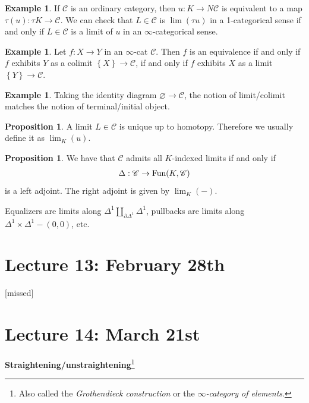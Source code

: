 \documentclass[12pt]{amsart}
\theoremstyle{definition}
\newtheorem{example}[theorem]{Example}
\newtheorem{proposition}[theorem]{Proposition}
\let\del\partial
\let\emptyset\varnothing
\begin{document}
\begin{example} If $\mathscr{C}$ is an ordinary category, then $u: K \to N\mathscr{C}$ is equivalent to a map $\tau(u): \tau K \to \mathscr{C}$. We can check that $L\in \mathscr{C}$ is $\lim(\tau u)$ in a 1-categorical sense if and only if $L\in \mathscr{C}$ is a limit of $u$ in an $\infty$-categorical sense.
\end{example}

\begin{example} Let $f: X \to Y$ in an $\infty$-cat $\mathscr{C}$. Then $f$ is an equivalence if and only if $f$ exhibits $Y$ as a colimit $\left\{ X \right\} \to \mathscr{C}$, if and only if $f$ exhibits $X$ as a limit $\left\{ Y \right\}\to \mathscr{C}$.
\end{example}

\begin{example} Taking the identity diagram $\emptyset \to \mathscr{C}$, the notion of limit/colimit matches the notion of terminal/initial object.
\end{example}

\begin{proposition} A limit $L\in \mathscr{C}$ is unique up to homotopy. Therefore we usually define it as $\lim_K(u)$.
\end{proposition}

\begin{proposition} We have that $\mathscr{C}$ admits all $K$-indexed limits if and only if
\begin{align*}
    \Delta: \mathscr{C} \to \text{Fun}(K,\mathscr{C})
\end{align*}
is a left adjoint. The right adjoint is given by $\lim_K(-)$.
\end{proposition}

Equalizers are limits along $\Delta^1 \amalg_{\del\Delta^1}\Delta^1$, pullbacks are limits along $\Delta^1 \times \Delta^1 - (0,0)$, etc.


\section{Lecture 13: February 28th}

[missed]

\section{Lecture 14: March 21st}

\begin{center}
    \textbf{Straightening/unstraightening}\footnote{Also called the \textit{Grothendieck construction} or the $\infty$\textit{-category of elements}.}
\end{center}
\end{document}
